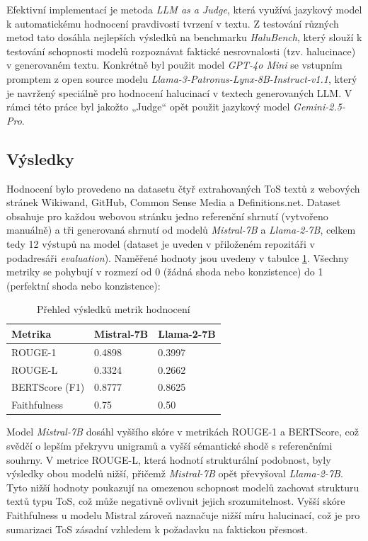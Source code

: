 Efektivní implementací je metoda \textit{LLM as a Judge}, která využívá jazykový model k automatickému hodnocení pravdivosti tvrzení v textu.
Z testování různých metod \cite{googleGoogleColab} tato dosáhla nejlepších výsledků na benchmarku \textit{HaluBench}, který slouží k testování schopnosti modelů rozpoznávat faktické nesrovnalosti (tzv. halucinace) v generovaném textu.
Konkrétně byl použit model \textit{GPT-4o Mini} se vstupním promptem z open source modelu \textit{Llama-3-Patronus-Lynx-8B-Instruct-v1.1}, který je navržený speciálně pro hodnocení halucinací v textech generovaných LLM.
V rámci této práce byl jakožto „Judge“ opět použit jazykový model \textit{Gemini-2.5-Pro}.

\subsection{Výsledky}
Hodnocení bylo provedeno na datasetu čtyř extrahovaných ToS textů z webových stránek Wikiwand, GitHub, Common Sense Media a Definitions.net.
Dataset obsahuje pro každou webovou stránku jedno referenční shrnutí (vytvořeno manuálně) a tři generovaná shrnutí od modelů \textit{Mistral-7B} a \textit{Llama-2-7B}, celkem tedy 12 výstupů na model
(dataset je uveden v přiloženém repozitáři v podadresáři \textit{evaluation}).
Naměřené hodnoty jsou uvedeny v tabulce \ref{tab:metric_results}.
Všechny metriky se pohybují v rozmezí od 0 (žádná shoda nebo konzistence) do 1 (perfektní shoda nebo konzistence):
\begin{table}[H]
    \centering
    \begin{tabular}{|p{}|p{}|p{}|}
        \hline
        \textbf{Metrika}      & \textbf{Mistral-7B} & \textbf{Llama-2-7B} \\ \hline
        ROUGE-1               & 0.4898              & 0.3997              \\ \hline
        ROUGE-L               & 0.3324              & 0.2662              \\ \hline
        BERTScore (F1)        & 0.8777              & 0.8625              \\ \hline
        Faithfulness          & 0.75                & 0.50                \\ \hline
    \end{tabular}
    \caption{Přehled výsledků metrik hodnocení}
    \label{tab:metric_results}
\end{table}

Model \textit{Mistral-7B} dosáhl vyššího skóre v metrikách ROUGE-1 a BERTScore, což svědčí o lepším překryvu unigramů a vyšší sémantické shodě s referenčními souhrny.
V metrice ROUGE-L, která hodnotí strukturální podobnost, byly výsledky obou modelů nižší, přičemž \textit{Mistral-7B} opět převyšoval \textit{Llama-2-7B}.
Tyto nižší hodnoty poukazují na omezenou schopnost modelů zachovat strukturu textů typu ToS, což může negativně ovlivnit jejich srozumitelnost.
Vyšší skóre Faithfulness u modelu Mistral zároveň naznačuje nižší míru halucinací, což je pro sumarizaci ToS zásadní vzhledem k požadavku na faktickou přesnost.

